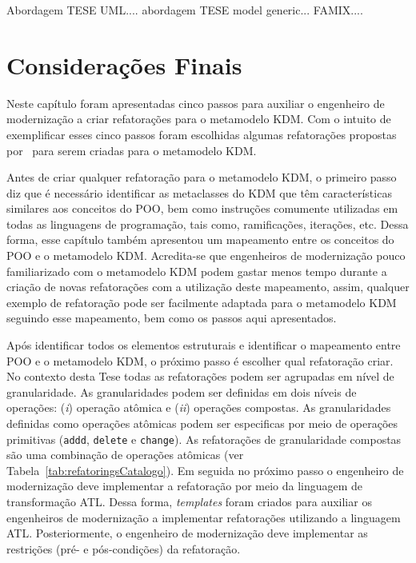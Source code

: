 Abordagem TESE UML....
abordagem TESE model generic...
FAMIX....
	
\section{Considerações Finais}\label{sec:consideracoes_finais_capitulo_reforacao}

Neste capítulo foram apresentadas cinco passos para auxiliar o engenheiro de modernização a criar refatorações para o metamodelo KDM. Com o intuito de exemplificar esses cinco passos foram escolhidas algumas refatorações propostas por~ para serem criadas para o metamodelo KDM. %

Antes de criar qualquer refatoração para o metamodelo KDM, o primeiro passo diz que é  necessário identificar as metaclasses do KDM que têm características similares aos conceitos do POO, bem como instruções comumente utilizadas em todas as linguagens de programação, tais como, ramificações, iterações, etc. Dessa forma, esse capítulo também apresentou um mapeamento entre os conceitos do POO e o metamodelo KDM. Acredita-se que engenheiros de modernização pouco familiarizado com o metamodelo KDM podem gastar menos tempo durante a criação de novas refatorações com a utilização deste mapeamento, assim, qualquer exemplo de refatoração pode ser facilmente adaptada para o metamodelo KDM seguindo esse mapeamento, bem como os passos aqui apresentados.

Após identificar todos os elementos estruturais e identificar o mapeamento entre POO e o metamodelo KDM, o próximo passo é escolher qual refatoração criar. No contexto desta Tese todas as refatorações podem ser agrupadas em nível de granularidade. As granularidades podem ser definidas em dois níveis de operações: (\textit{i}) operação atômica e (\textit{ii}) operações compostas. As granularidades definidas como operações atômicas podem ser especificas por meio de operações primitivas (\texttt{addd}, \texttt{delete} e \texttt{change}). As refatorações de granularidade compostas são uma combinação de operações atômicas (ver Tabela~\ref{tab:refatoringsCatalogo}). Em seguida no próximo passo o engenheiro de modernização deve implementar a refatoração por meio da linguagem de transformação ATL. Dessa forma, \textit{templates} foram criados para auxiliar os engenheiros de modernização a implementar refatorações utilizando a linguagem ATL. Posteriormente, o engenheiro de modernização deve implementar as restrições (pré- e pós-condições) da refatoração.

